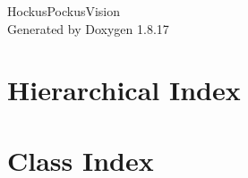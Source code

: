 \let\mypdfximage\pdfximage\def\pdfximage{\immediate\mypdfximage}\documentclass[twoside]{book}
\newcommand{\+}{\discretionary{\mbox{\scriptsize$\hookleftarrow$}}{}{}}
\newcommand{\clearemptydoublepage}{%
  \newpage{\pagestyle{empty}\cleardoublepage}%
}
\begin{document}
\hypersetup{pageanchor=false,
             bookmarksnumbered=true,
             pdfencoding=unicode
            }
\begin{titlepage}
\vspace*{7cm}
\begin{center}%
{\Large Hockus\+Pockus\+Vision }\\
\vspace*{1cm}
{\large Generated by Doxygen 1.8.17}\\
\end{center}
\end{titlepage}
\clearemptydoublepage
{}
\tableofcontents
\clearemptydoublepage
{}
\hypersetup{pageanchor=true}

\chapter{Hierarchical Index}

\chapter{Class Index}

\end{document}
